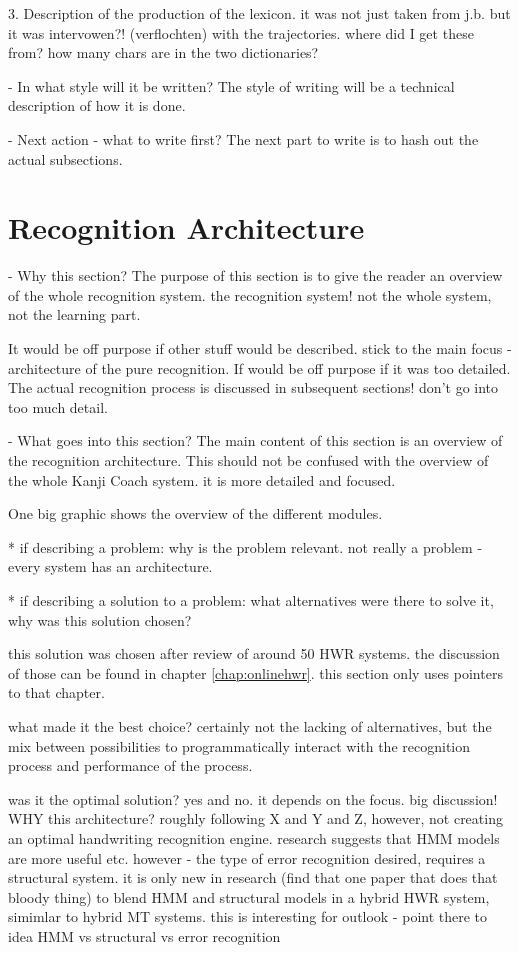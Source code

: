   3. Description of the production of the lexicon.
     it was not just taken from j.b. but it was intervowen?! (verflochten) 
     with the trajectories. where did I get these from? 
     how many chars are in the two dictionaries?

- In what style will it be written?
  The style of writing will be a technical description of how it is done.

- Next action - what to write first?
  The next part to write is to hash out the actual subsections.

\section{Recognition Architecture}
\label{sec:hwre:recognitionarchitecture}

- Why this section? 
  The purpose of this section is to give the reader an overview of the whole
  recognition system. the recognition system! not the whole system, 
  not the learning part.

  It would be off purpose if other stuff would be described.
  stick to the main focus - architecture of the pure recognition.
  If would be off purpose if it was too detailed.
  The actual recognition process is discussed in subsequent sections!
  don't go into too much detail.

- What goes into this section?
  The main content of this section is an overview of the recognition 
  architecture. This should not be confused with the overview of the
  whole Kanji Coach system. it is more detailed and focused.

  One big graphic shows the overview of the different modules.
  
  * if describing a problem: why is the problem relevant.
    not really a problem - every system has an architecture.
   
  * if describing a solution to a problem: what alternatives were
    there to solve it, why was this solution chosen? 

    this solution was chosen after review of around 50 HWR systems.
    the discussion of those can be found in chapter \ref{chap:onlinehwr}.
    this section only uses pointers to that chapter.

    what made it the best choice?
    certainly not the lacking of alternatives, but the mix between 
    possibilities to programmatically interact with the recognition process
    and performance of the process.

    was it the optimal solution?
    yes and no.
    it depends on the focus.
    big discussion! WHY this architecture?
    roughly following X and Y and Z,
    however, not creating an optimal handwriting recognition engine.
    research suggests that HMM models are more useful etc.
    however - the type of error recognition desired,
    requires a structural system.
    it is only new in research (find that one paper 
    that does that bloody thing) to blend HMM and structural models
    in a hybrid HWR system, simimlar to hybrid MT systems.
    this is interesting for outlook - point there to idea
    HMM vs structural vs error recognition

